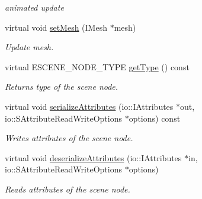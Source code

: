 \begin{DoxyCompactItemize}
\begin{DoxyCompactList}\small\item\em animated update \end{DoxyCompactList}\item 
\hypertarget{classirr_1_1scene_1_1_c_water_surface_scene_node_ac7c1792c61f0cfdf2559f81e20c2c828}{virtual void \hyperlink{classirr_1_1scene_1_1_c_water_surface_scene_node_ac7c1792c61f0cfdf2559f81e20c2c828}{set\-Mesh} (I\-Mesh $\ast$mesh)}\label{classirr_1_1scene_1_1_c_water_surface_scene_node_ac7c1792c61f0cfdf2559f81e20c2c828}

\begin{DoxyCompactList}\small\item\em Update mesh. \end{DoxyCompactList}\item 
\hypertarget{classirr_1_1scene_1_1_c_water_surface_scene_node_a20619dab75229bff0e158f93bd45d393}{virtual E\-S\-C\-E\-N\-E\-\_\-\-N\-O\-D\-E\-\_\-\-T\-Y\-P\-E \hyperlink{classirr_1_1scene_1_1_c_water_surface_scene_node_a20619dab75229bff0e158f93bd45d393}{get\-Type} () const }\label{classirr_1_1scene_1_1_c_water_surface_scene_node_a20619dab75229bff0e158f93bd45d393}

\begin{DoxyCompactList}\small\item\em Returns type of the scene node. \end{DoxyCompactList}\item 
\hypertarget{classirr_1_1scene_1_1_c_water_surface_scene_node_a939d2f40b557f33348f3e489cadda7ca}{virtual void \hyperlink{classirr_1_1scene_1_1_c_water_surface_scene_node_a939d2f40b557f33348f3e489cadda7ca}{serialize\-Attributes} (io\-::\-I\-Attributes $\ast$out, io\-::\-S\-Attribute\-Read\-Write\-Options $\ast$options) const }\label{classirr_1_1scene_1_1_c_water_surface_scene_node_a939d2f40b557f33348f3e489cadda7ca}

\begin{DoxyCompactList}\small\item\em Writes attributes of the scene node. \end{DoxyCompactList}\item 
\hypertarget{classirr_1_1scene_1_1_c_water_surface_scene_node_a250f4f29d98e9083491c57e987354615}{virtual void \hyperlink{classirr_1_1scene_1_1_c_water_surface_scene_node_a250f4f29d98e9083491c57e987354615}{deserialize\-Attributes} (io\-::\-I\-Attributes $\ast$in, io\-::\-S\-Attribute\-Read\-Write\-Options $\ast$options)}\label{classirr_1_1scene_1_1_c_water_surface_scene_node_a250f4f29d98e9083491c57e987354615}

\begin{DoxyCompactList}\small\item\em Reads attributes of the scene node. \end{DoxyCompactList}\end{DoxyCompactItemize}
